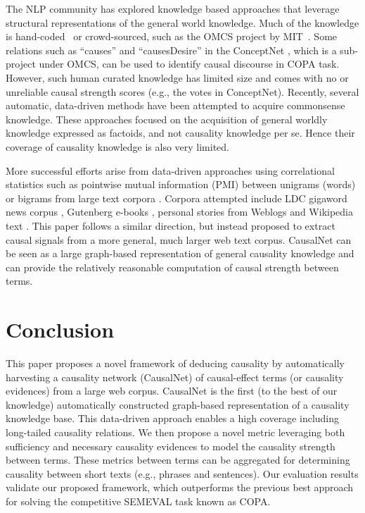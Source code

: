 \documentclass[letterpaper]{article}
\begin{document}
The NLP community has explored knowledge based approaches
that leverage structural representations of the general world knowledge.
Much of the knowledge is hand-coded~\cite{lenat1995cyc}
or crowd-sourced, such as the OMCS project by MIT~\cite{singh2002open}.
Some relations such as ``causes'' and
``causesDesire'' in the ConceptNet \cite{liu2004commonsense},
which is a sub-project under OMCS, can be used to identify causal
discourse in COPA task.
However, such human curated knowledge
has limited size and comes with no or unreliable causal strength
scores (e.g., the votes in ConceptNet).
Recently, several automatic, data-driven methods have
been attempted to acquire commonsense
knowledge\cite{schubert2002can,gordon2010learning,gordon2010mining,akbikweltmodell}.
These approaches focused on the acquisition of general
worldly knowledge expressed as factoids, and not causality knowledge
per se. Hence their coverage of causality knowledge is also very limited.

More successful efforts arise from data-driven approaches
using correlational statistics \cite{gordon2012copa} such as pointwise mutual
information (PMI) between unigrams (words) or bigrams from large
text corpora \cite{Mihalcea2006:CKM}. Corpora attempted include LDC
gigaword news corpus \cite{goodwin2012utdhlt}, Gutenberg e-books
\cite{roemmele2011choice}, personal stories from Weblogs
\cite{gordon2011commonsense} and Wikipedia text
\cite{jabeen2014exploiting}.
This paper follows a similar direction, but instead proposed to extract
causal signals from a more general, much larger web text corpus.
CausalNet can be seen as a large graph-based representation of general
causality knowledge and can provide the relatively reasonable computation of
causal strength between terms.

% 
\section{Conclusion}
\label{sec:conclude}
This paper proposes a novel framework of
deducing causality by automatically harvesting a
causality network (CausalNet) of causal-effect terms (or causality evidences)
from a large web corpus.
CausalNet is the first (to the best of our
knowledge) automatically constructed graph-based
representation of a causality knowledge base.
This data-driven approach enables
a high coverage including long-tailed causality
relations.
We then propose a novel metric leveraging both sufficiency and
necessary causality evidences
to model the causality strength
between terms.
These metrics between terms can be aggregated for
determining causality
between short texts (e.g., phrases and sentences).
Our evaluation results validate our proposed framework, which outperforms
the previous best approach for solving the competitive SEMEVAL task
known as COPA.
\end{document}
